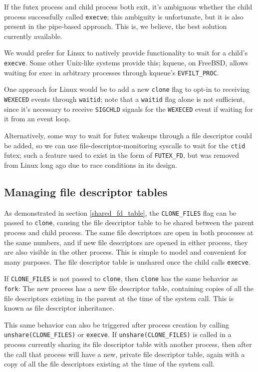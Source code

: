 \documentclass[sigplan]{acmart}
\begin{document}
If the futex process and child process both exit,
it's ambiguous whether the child process successfully called \texttt{execve};
this ambiguity is unfortunate, but it is also present in the pipe-based approach.
This is, we believe, the best solution currently available.

We would prefer for Linux to natively provide functionality to wait for a child's \texttt{execve}.
Some other Unix-like systems provide this;
kqueue, on FreeBSD, allows waiting for exec in arbitrary processes through kqueue's \verb|EVFILT_PROC|.

One approach for Linux would be to add a new \texttt{clone} flag to
opt-in to receiving \texttt{WEXECED} events through \texttt{waitid};
note that a \texttt{waitid} flag alone is not sufficient,
since it's necessary to receive \texttt{SIGCHLD} signals for the \texttt{WEXECED} event if waiting for it from an event loop.

Alternatively, some way to wait for futex wakeups through a file descriptor could be added,
so we can use file-descriptor-monitoring syscalls to wait for the \texttt{ctid} futex;
such a feature used to exist in the form of \verb|FUTEX_FD|,
but was removed from Linux long ago due to race conditions in its design.
\subsection{Managing file descriptor tables}\label{fdtables}
As demonstrated in section \ref{shared_fd_table},
the \verb|CLONE_FILES| flag can be passed to \texttt{clone},
causing the file descriptor table to be shared between the parent process and child process.
The same file descriptors are open in both processes at the same numbers,
and if new file descriptors are opened in either process,
they are also visible in the other process.
This is simple to model and convenient for many purposes.
The file descriptor table is unshared once the child calls \texttt{execve}.

If \verb|CLONE_FILES| is not passed to \texttt{clone},
then \texttt{clone} has the same behavior as \texttt{fork}:
The new process has a new file descriptor table,
containing copies of all the file descriptors existing in the parent at the time of the system call.
This is known as file descriptor inheritance.

This same behavior can also be triggered after process creation by calling \verb|unshare(CLONE_FILES)| or \texttt{execve}.
If \verb|unshare(CLONE_FILES)|
is called in a process currently sharing its file descriptor table with another process,
then after the call that process will have a new, private file descriptor table,
again with a copy of all the file descriptors existing at the time of the system call.
\end{document}
